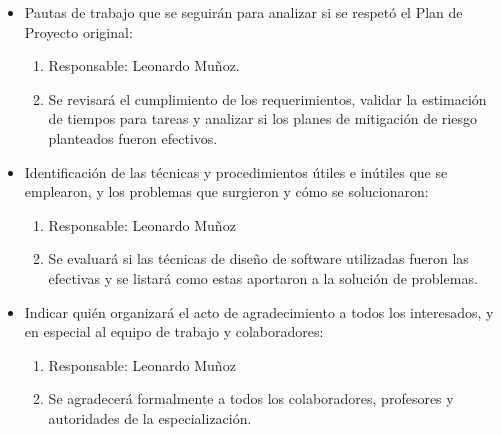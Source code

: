 \documentclass[
11pt, %
codirector, %
]{charter}
\begin{document}
\begin{itemize}
	\item Pautas de trabajo que se seguirán para analizar si se respetó el Plan de Proyecto original:
	
	\begin{enumerate}
	\item Responsable: Leonardo Muñoz.
	\item Se revisará el cumplimiento de los requerimientos, validar la estimación de tiempos para tareas y analizar si los planes de mitigación de riesgo planteados fueron efectivos.
	\end{enumerate}
	
	\item Identificación de las técnicas y procedimientos útiles e inútiles que se emplearon, y los problemas que surgieron y cómo se solucionaron:
	
	\begin{enumerate}
	\item Responsable: Leonardo Muñoz
	\item Se evaluará si las técnicas de diseño de software utilizadas fueron las efectivas y se listará como estas aportaron a la solución de problemas.
	\end{enumerate}
	
	 
	\item Indicar quién organizará el acto de agradecimiento a todos los interesados, y en especial al equipo de trabajo y colaboradores:
	\begin{enumerate}
	\item Responsable: Leonardo Muñoz
	\item Se agradecerá formalmente a todos los colaboradores, profesores y autoridades de la especialización.
	\end{enumerate}
	  
	  
\end{itemize}
\end{document}
